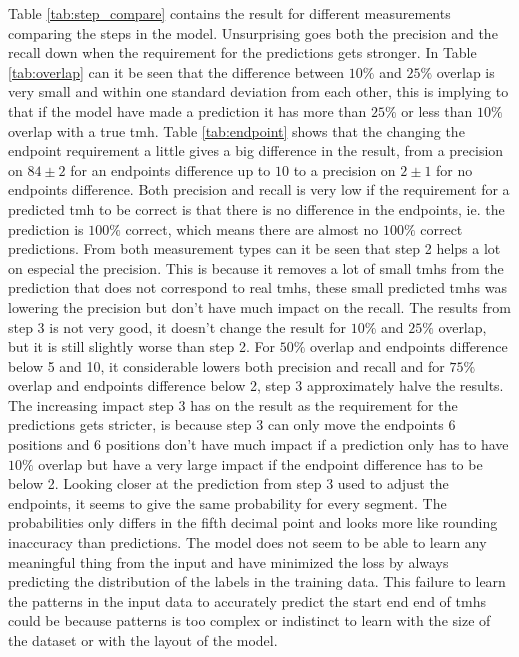 Table \ref{tab:step_compare} contains the result for different measurements 
comparing the steps in the model. Unsurprising goes both the precision and the 
recall down when the requirement for the predictions gets stronger. In 
Table \ref{tab:overlap} can it be seen that the difference between $10\%$ and $25\%$
overlap is very small and within one standard deviation from each other, 
this is implying to that if the model have made a prediction it has more than 
$25\%$ or less than $10\%$ overlap with a true \gls{tmh}.
Table \ref{tab:endpoint} shows that the changing the endpoint requirement a little 
gives a big difference in the result, from a precision on $84 \pm 2$ for an endpoints 
difference up to $10$ to a precision on $2 \pm 1$ for no endpoints difference.
Both precision and recall is very low if the requirement for a predicted \gls{tmh}
to be correct is that there is no difference in the endpoints, ie. the prediction 
is $100\%$ correct, which means there are almost no $100\%$ correct predictions.
From both measurement types can it be seen that step 2 helps a lot on especial 
the precision. This is because it removes a lot of small \glspl{tmh} from the 
prediction that does not correspond to real \glspl{tmh}, these small predicted 
\glspl{tmh} was lowering the precision but don't have much impact on the recall.
The results from step 3 is not very good, it doesn't change the result for 
$10\%$ and $25\%$ overlap, but it is still slightly worse than step 2. 
For $50\%$ overlap and endpoints difference below 5 and 10, it considerable lowers
both precision and recall and for $75\%$ overlap and endpoints difference below 
2, step 3 approximately halve the results. The increasing impact step 3 has on the 
result as the requirement for the predictions gets stricter, is because step 3 
can only move the endpoints 6 positions and 6 positions don't have much impact 
if a prediction only has to have $10\%$ overlap but have a very large impact 
if the endpoint difference has to be below 2. 
Looking closer at the prediction from step 3 used to adjust the endpoints, it 
seems to give the same probability for every segment. The probabilities only
differs in the fifth decimal point and looks more like rounding inaccuracy
than predictions. The model does not seem to be able to learn any meaningful
thing from the input and have minimized the loss by always predicting the 
distribution of the labels in the training data. 
This failure to learn the patterns in the input data to accurately predict
the start end end of \glspl{tmh} could be because patterns is too complex or 
indistinct to learn with the size of the dataset or with the layout of the 
model.

